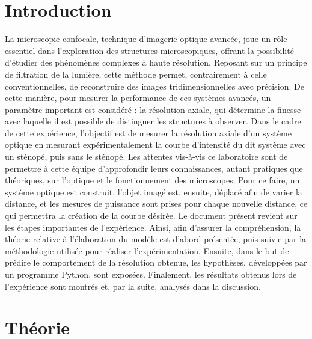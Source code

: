 \documentclass[11pt,letterpaper]{article}
\begin{document}
\section{Introduction}
La microscopie confocale, technique d'imagerie optique avancée, joue un rôle essentiel dans l'exploration 
des structures microscopiques, offrant la possibilité d'étudier des phénomènes complexes à haute 
résolution. Reposant sur un principe de filtration de la lumière, cette méthode permet, contrairement à 
celle conventionnelles, de reconstruire des images tridimensionnelles avec précision. De cette manière,
pour mesurer la performance de ces systèmes avancés, un paramètre important est considéré : la résolution
axiale, qui détermine la finesse avec laquelle il est possible de distinguer les structures à observer. 
Dans le cadre de cette expérience, l'objectif est de mesurer la résolution axiale d'un système optique 
en mesurant expérimentalement la courbe d'intensité du dit système avec un sténopé, puis sans le sténopé.
Les attentes vis-à-vis ce laboratoire sont de permettre à cette équipe d'approfondir leurs connaissances,
autant pratiques que théoriques, sur l'optique et le fonctionnement des microscopes. Pour ce faire, un
système optique est construit, l'objet imagé est, ensuite, déplacé afin de varier la distance, et les
mesures de puissance sont prises pour chaque nouvelle distance, ce qui permettra la création de la courbe
désirée. Le document présent revient sur les étapes importantes de l'expérience. Ainsi, afin d'assurer
la compréhension, la théorie relative à l'élaboration du modèle est d'abord présentée, puis suivie par
la méthodologie utilisée pour réaliser l'expérimentation. Ensuite, dans le but de prédire le
comportement de la résolution obtenue, les hypothèses, développées par un programme Python, sont
exposées. Finalement, les résultats obtenus lors de l'expérience sont montrés et, par la suite,
analysés dans la discussion.

\section{Théorie}
\end{document}
